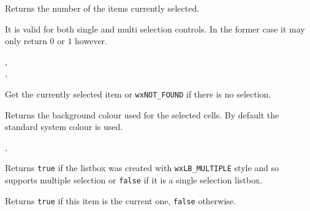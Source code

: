 


\label{wxvlistboxgetselectedcount}


Returns the number of the items currently selected.

It is valid for both single and multi selection controls. In the former case it
may only return $0$ or $1$ however.


,\\
,\\


\label{wxvlistboxgetselection}


Get the currently selected item or {\tt wxNOT\_FOUND} if there is no selection.


\label{wxvlistboxgetselectionbackground}


Returns the background colour used for the selected cells. By default the
standard system colour is used.


,\\


\label{wxvlistboxishasmultipleselection}


Returns {\tt true} if the listbox was created with {\tt wxLB\_MULTIPLE} style
and so supports multiple selection or {\tt false} if it is a single selection
listbox.


\label{wxvlistboxiscurrent}


Returns {\tt true} if this item is the current one, {\tt false} otherwise.

